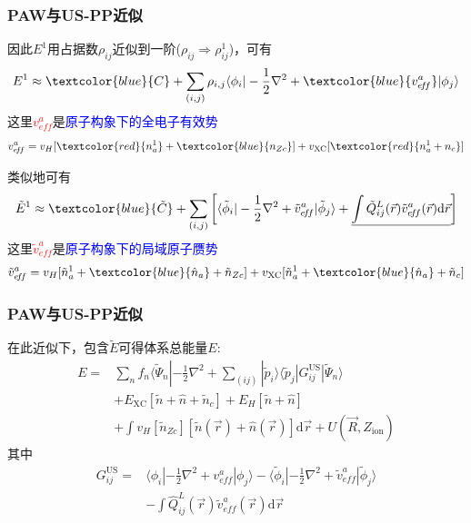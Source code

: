 \frame
{
	\frametitle{\textrm{PAW}与\textrm{US-PP}近似}
	因此$E^1$用占据数$\rho_{ij}$近似到一阶($\rho_{ij}\Rightarrow\rho_{ij}^1$)，可有
	\begin{displaymath}
		E^1\approx\textcolor{blue}{C}+\sum_{(i,j)}\rho_{i,j}\langle\phi_i|-\frac12\nabla^2+\textcolor{blue}{v_{e\!f\!f}^a}|\phi_j\rangle
	\end{displaymath}
	这里\textcolor{red}{$v_{e\!f\!f}^a$}是\textcolor{blue}{原子构象下的全电子有效势}
	\begin{displaymath}
		v_{e\!f\!f}^a=v_H[\textcolor{red}{n_a^1}+\textcolor{blue}{n_{Zc}}]+v_{\mathrm{XC}}[\textcolor{red}{n_a^1+n_c}]
	\end{displaymath}

	类似地可有
	\begin{displaymath}
		\tilde E^1\approx\textcolor{blue}{\tilde C}+\sum_{(i,j)}\left[\langle\tilde\phi_i|-\frac12\nabla^2+\tilde v_{e\!f\!f}^a|\tilde\phi_j\rangle+\underline{\int\tilde Q_{ij}^L(\vec r)\tilde v_{e\!f\!f}^a(\vec r)\mathrm{d}\vec r}\right]
	\end{displaymath}
	这里\textcolor{red}{$\tilde v_{e\!f\!f}^a$}是\textcolor{blue}{原子构象下的局域原子赝势}
	$$\tilde v_{e\!f\!f}^a=v_H[\tilde n_a^1+\textcolor{blue}{\hat n_a}+\tilde n_{Zc}]+v_{\mathrm{XC}}[\tilde n_a^1+\textcolor{blue}{\hat n_a}+\tilde n_c]$$
}

\frame
{
	\frametitle{\textrm{PAW}与\textrm{US-PP}近似}
	在此近似下，包含$\tilde E$可得体系总能量$E$:
	\begin{displaymath}
		\begin{aligned}
			E=&\sum_nf_n\langle\tilde\Psi_n|-\frac12\nabla^2+\sum_{(ij)}|\tilde p_i\rangle\langle\tilde p_j|G_{ij}^{\mathrm{US}}|\tilde\Psi_n\rangle\\
			&+E_{\mathrm{XC}}[\tilde n+\hat n+\tilde n_c]+E_H[\tilde n+\hat n]\\
			&+\int v_H[\tilde n_{Zc}][\tilde n(\vec r)+\hat n(\vec r)]\mathrm{d}\vec r+U(\vec R,Z_{\mathrm{ion}})
		\end{aligned}
	\end{displaymath}
	其中
	\begin{displaymath}
		\begin{aligned}
			G_{ij}^{\mathrm{US}}=&\langle\phi_i|-\frac12\nabla^2+v_{e\!f\!f}^a|\phi_j\rangle-\langle\tilde\phi_i|-\frac12\nabla^2+\tilde v_{e\!f\!f}^a|\tilde\phi_j\rangle\\
			&-\int\hat Q_{ij}^L(\vec r)\tilde v_{e\!f\!f}^a(\vec r)\mathrm{d}\vec r
		\end{aligned}
	\end{displaymath}
}


